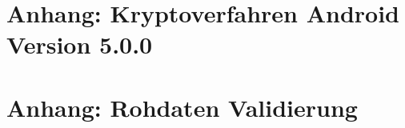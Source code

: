 \documentclass[10pt, a4paper,headsepline,pointednumbers]{scrreprt}
\begin{document}
\chapter{Anhang: Kryptoverfahren Android Version 5.0.0}


\chapter{Anhang: Rohdaten Validierung}




\end{document}
